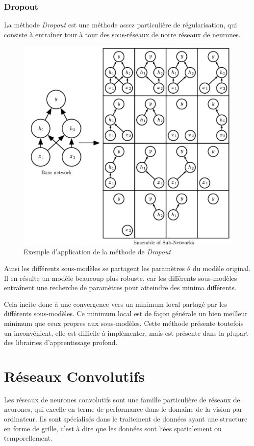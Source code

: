 \documentclass[a4paper, 11pt]{report}
\begin{document}
\subsubsection{Dropout}
La méthode \emph{Dropout} est une méthode assez particulière de régularisation, qui consiste à entraîner tour à tour des sous-réseaux de notre réseaux de neurones.
\begin{figure}[H]
	\begin{center}
		\includegraphics[scale=0.20]{Images/Dropout.png}
		\caption{Exemple d'application de la méthode de \emph{Dropout}}
	\end{center}
\end{figure}
Ainsi les différents sous-modèles se partagent les paramètres $\theta$ du modèle original.
Il en résulte un modèle beaucoup plus robuste, car les différents sous-modèles entraînent une recherche de paramètres pour atteindre des minima différents.

Cela incite donc à une convergence vers un minimum local partagé par les différents sous-modèles.
Ce minimum local est de façon générale un bien meilleur minimum que ceux propres aux sous-modèles.
Cette méthode présente toutefois un inconvénient, elle est difficile à implémenter, mais est présente dans la plupart des librairies d'apprentissage profond.
\section{Réseaux Convolutifs}
Les réseaux de neurones convolutifs sont une famille particulière de réseaux de neurones, qui excelle en terme de performance dans le domaine de la vision par ordinateur.
Ils sont spécialisés dans le traitement de données ayant une structure en forme de grille, c'est à dire que les données sont liées spatialement ou temporellement.
\end{document}
